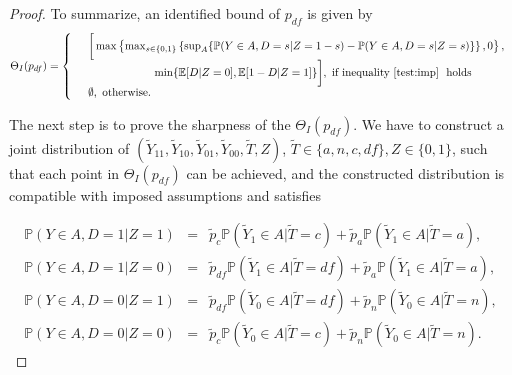 \documentclass[12pt]{article}
\theoremstyle{plain}
\theoremstyle{definition}
\theoremstyle{remark}
\begin{document}
\begin{proof}
To summarize, an identified bound of $p_{df}$ is given by
\small \begin{equation*}
    \Theta_{I}(p_{df}) = \left\{\begin{array}{lll}
    & \bigg[\max \left\{\max _{s \in\{0,1\}}\left\{\sup _A\{\mathbb{P}(Y \in A, D=s  \vert  Z=1-s)-\mathbb{P}(Y \in A, D=s  \vert  Z=s)\}\right\}, 0\right\}, \\
    & \qquad \qquad \qquad \min \{\mathbb{E}[D  \vert  Z=0], \mathbb{E}[1-D  \vert  Z=1]\}\bigg], \text{ if inequality \eqref{test:imp} } \text{ holds } \\
    & \emptyset, \text{ otherwise}.
    \end{array}\right.
    \end{equation*}

The next step is to prove the sharpness of the $\Theta_I(p_{df})$. We have to construct a joint distribution of $(\tilde{Y}_{11}, \tilde{Y}_{10}, \tilde{Y}_{01}, \tilde{Y}_{00}, \tilde{T}, Z)$, $\tilde{T} \in \{a, n, c, df\}, Z \in \{0, 1\}$, such that each point in $\Theta_I(p_{df})$ can be achieved, and the constructed distribution is compatible with imposed assumptions and satisfies

\begin{eqnarray}
\label{eq:proof1} 
\mathbb{P}(Y \in A, D=1  \vert  Z=1) &=& \tilde{p}_c \mathbb{P}(\tilde{Y}_1 \in A  \vert  \tilde{T}=c)+\tilde{p}_a \mathbb{P}(\tilde{Y}_1 \in A  \vert  \tilde{T}=a), \\
\label{eq:proof2}
\mathbb{P}(Y \in A, D=1  \vert  Z=0) &=& \tilde{p}_{df} \mathbb{P}(\tilde{Y}_1 \in A  \vert  \tilde{T}=df)+\tilde{p}_a \mathbb{P}(\tilde{Y}_1 \in A  \vert  \tilde{T}=a),\\
\label{eq:proof3}
\mathbb{P}(Y \in A, D=0  \vert  Z=1) &=& \tilde{p}_{d f} \mathbb{P}(\tilde{Y}_0 \in A  \vert  \tilde{T}=d f)+\tilde{p}_n \mathbb{P}(\tilde{Y}_0 \in A  \vert  \tilde{T}=n), \\
\label{eq:proof4}
\mathbb{P}(Y \in A, D=0  \vert  Z=0) &=& \tilde{p}_c \mathbb{P}(\tilde{Y}_0 \in A  \vert  \tilde{T}=c)+\tilde{p}_n \mathbb{P}(\tilde{Y}_0 \in A  \vert  \tilde{T}=n).
\end{eqnarray}


\end{proof}
\end{document}
